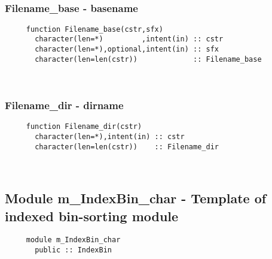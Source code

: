  
\mbox{}\hrulefill\ 

  \subsubsection{Filename\_base - basename}
  
\begin{verbatim} 
     function Filename_base(cstr,sfx)
       character(len=*)         ,intent(in) :: cstr
       character(len=*),optional,intent(in) :: sfx
       character(len=len(cstr))             :: Filename_base
 \end{verbatim}
%
 
 
\mbox{}\hrulefill\ 
 

  \subsubsection{Filename\_dir - dirname}

\begin{verbatim} 
     function Filename_dir(cstr)
       character(len=*),intent(in) :: cstr
       character(len=len(cstr))    :: Filename_dir
 \end{verbatim}
%


 
 
\mbox{}\hrulefill\ 
 
\subsection{Module m\_IndexBin\_char - Template of indexed bin-sorting module }

\begin{verbatim} 
     module m_IndexBin_char
       public :: IndexBin
 \end{verbatim}
%
 
